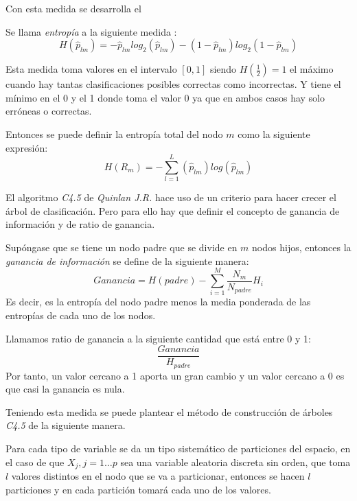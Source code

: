Con esta medida se desarrolla el 

\begin{defi}
Se llama \emph{entropía} a la siguiente medida \cite{Brown 2004}:
\begin{equation}
H(\hat{p}_{lm})=-\hat{p}_{lm}log_2(\hat{p}_{lm})-(1-\hat{p}_{lm})log_2(1-\hat{p}_{lm})
\end{equation}

\noindent Esta medida toma valores en el intervalo $[0,1]$ siendo $H(\frac{1}{2})=1$ el máximo cuando hay tantas clasificaciones posibles correctas como incorrectas. Y tiene el mínimo en el 0 y el 1 donde toma el valor 0 ya que en ambos casos hay solo erróneas o correctas.

\noindent Entonces se puede definir la entropía total del nodo $m$ como la siguiente expresión:
\begin{equation}
H(R_m)=-\sum_{l=1}^L(\hat{p}_{lm})log(\hat{p}_{lm})
\end{equation}
\end{defi}

\noindent El algoritmo \emph{C4.5} de \emph{Quinlan J.R.}\cite{Quinlan 2014} hace uso de un criterio para hacer crecer el árbol de clasificación. Pero para ello hay que definir el concepto de ganancia de información y de ratio de ganancia.
\begin{defi}
Supóngase que se tiene un nodo padre que se divide en $m$ nodos hijos, entonces la \emph{ganancia de información } se define de la siguiente manera: 
\begin{equation}
Ganancia=H(padre)-\sum_{i=1}^M \dfrac{N_m}{N_{padre}}H_i
\end{equation}
\noindent Es decir, es la entropía del nodo padre menos la media ponderada de las entropías de cada uno de los nodos. 
\end{defi}

\begin{defi}
Llamamos ratio de ganancia a la siguiente cantidad que está entre 0 y 1:
\begin{equation}
\dfrac{Ganancia}{H_{padre}}
\end{equation}
Por tanto, un valor cercano a 1  aporta un gran cambio y un valor cercano a 0 es que casi la ganancia es nula.   
\end{defi}

\noindent Teniendo esta medida se puede plantear el método de construcción de árboles \emph{C4.5} \cite{Loh 2014} de la siguiente manera.

\noindent Para cada tipo de variable se da un tipo sistemático de particiones del espacio, en el caso de que $X_j, j=1\ldots p$ sea una variable aleatoria discreta sin orden, que toma $l$ valores distintos en el nodo que se va a particionar, entonces se hacen $l$ particiones y en cada partición tomará cada uno de los valores. 

